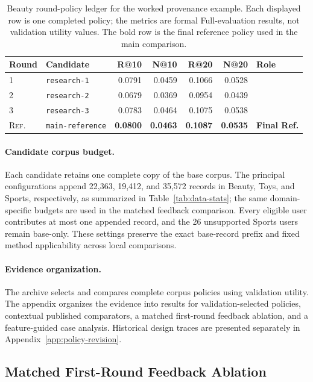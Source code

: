 \begin{table}[H]
\centering
\caption{Beauty round-policy ledger for the worked provenance example. Each displayed row is one completed policy; the metrics are formal Full-evaluation results, not validation utility values. The bold row is the final reference policy used in the main comparison.}
\label{tab:beauty-candidate-ledger}
\scriptsize
\setlength{\tabcolsep}{2.8pt}
\begin{tabular}{llrrrrl}
\hline
Round & Candidate & R@10 & N@10 & R@20 & N@20 & Role \\
\hline
1 & \texttt{research-1} & 0.0791 & 0.0459 & 0.1066 & 0.0528 & \\
2 & \texttt{research-2} & 0.0679 & 0.0369 & 0.0954 & 0.0439 & \\
3 & \texttt{research-3} & 0.0783 & 0.0464 & 0.1075 & 0.0538 & \\
 \textsc{Ref.} & \texttt{main-reference} & \textbf{0.0800} & \textbf{0.0463} & \textbf{0.1087} & \textbf{0.0535} & \textbf{Final Ref.} \\
\hline
\end{tabular}
\end{table}

\paragraph{Candidate corpus budget.}
Each candidate retains one complete copy of the base corpus. The principal configurations append 22,363, 19,412, and 35,572 records in Beauty, Toys, and Sports, respectively, as summarized in Table~\ref{tab:data-stats}; the same domain-specific budgets are used in the matched feedback comparison. Every eligible user contributes at most one appended record, and the 26 unsupported Sports users remain base-only. These settings preserve the exact base-record prefix and fixed method applicability across local comparisons.

\paragraph{Evidence organization.}
The archive selects and compares complete corpus policies using validation utility. The appendix organizes the evidence into results for validation-selected policies, contextual published comparators, a matched first-round feedback ablation, and a feature-guided case analysis. Historical design traces are presented separately in Appendix~\ref{app:policy-revision}.

\subsection{Matched First-Round Feedback Ablation}

